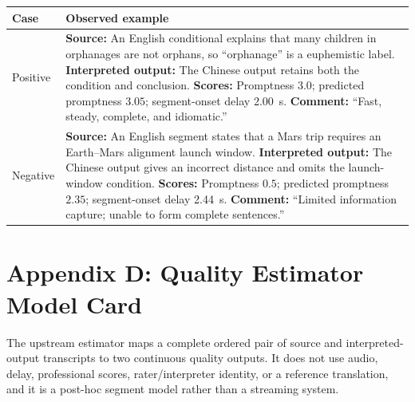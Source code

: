 \begin{center}
\begin{minipage}{\columnwidth}
\centering
\scriptsize
\renewcommand{\arraystretch}{1.12}
\setlength{\tabcolsep}{2pt}
\label{tab:case-pairs}
\begin{tabular}{p{}p{}}
\toprule
Case & Observed example \\
\midrule
Positive & \textbf{Source:} An English conditional explains that many children in orphanages are not orphans, so ``orphanage'' is a euphemistic label. \newline \textbf{Interpreted output:} The Chinese output retains both the condition and conclusion. \newline \textbf{Scores:} Promptness $3.0$; predicted promptness $3.05$; segment-onset delay 2.00~s. \newline \textbf{Comment:} ``Fast, steady, complete, and idiomatic.'' \\
Negative & \textbf{Source:} An English segment states that a Mars trip requires an Earth--Mars alignment launch window. \newline \textbf{Interpreted output:} The Chinese output gives an incorrect distance and omits the launch-window condition. \newline \textbf{Scores:} Promptness $0.5$; predicted promptness $2.35$; segment-onset delay 2.44~s. \newline \textbf{Comment:} ``Limited information capture; unable to form complete sentences.'' \\
\bottomrule
\end{tabular}
\renewcommand{\arraystretch}{1}
\setlength{\tabcolsep}{6pt}
\end{minipage}
\end{center}

\section*{Appendix D: Quality Estimator Model Card}

The upstream estimator maps a complete ordered pair of source and
interpreted-output transcripts to two continuous quality outputs. It does not
use audio, delay, professional scores, rater/interpreter identity, or a
reference translation, and it is a post-hoc segment model rather than a
streaming system.

